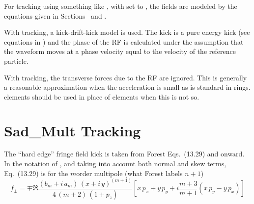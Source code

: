For tracking using something like , with  set to ,
the fields are modeled by the equations given in Sections~ and .

With  tracking, a kick-drift-kick model is used. The kick is a
pure energy kick (see equations in ) and the phase of the RF is calculated under the
assumption that the waveform moves at a phase velocity equal to the velocity of the reference
particle.

With  tracking, the transverse forces due to the RF are ignored. This is generally
a reasonable approximation when the acceleration is small as is standard in rings. 
elements should be used in place of  elements when this is not so.

\section{Sad\_Mult Tracking}
\label{s:sad.mult.std}

The ``hard edge'' fringe field kick is taken from Forest\cite{b:forest} Eqs.~(13.29) and onward.
In the notation of \bmad, and taking into account both normal and skew terms, Eq.~(13.29)
is for the $m$\th order multipole (what Forest labels $n+1$)
\begin{equation}
  f_\pm = \mp \Re \frac{(b_m + i \, a_m) \, (x + i \, y)^{(m+1)}}{4 \, (m+2) \, (1 + p_z)}
    \left[ x \, p_x + y \, p_y + i\frac{m+3}{m+1}(x \, p_y - y \, p_x) \right]
\end{equation}

